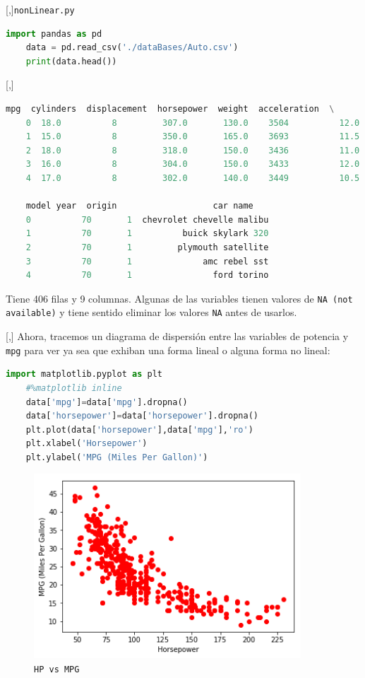 [,]{\texttt{nonLinear.py}}
\begin{lstlisting}[language=Python]
	import pandas as pd
	data = pd.read_csv('./dataBases/Auto.csv')
	print(data.head())
\end{lstlisting}

[,]{}

\begin{lstlisting}[language=Python]
	mpg  cylinders  displacement  horsepower  weight  acceleration  \
	0  18.0          8         307.0       130.0    3504          12.0
	1  15.0          8         350.0       165.0    3693          11.5
	2  18.0          8         318.0       150.0    3436          11.0
	3  16.0          8         304.0       150.0    3433          12.0
	4  17.0          8         302.0       140.0    3449          10.5
	
	model year  origin                   car name
	0          70       1  chevrolet chevelle malibu
	1          70       1          buick skylark 320
	2          70       1         plymouth satellite
	3          70       1              amc rebel sst
	4          70       1                ford torino
\end{lstlisting}


Tiene 406 filas y 9 columnas. Algunas de las variables tienen valores de \texttt{NA (not available)} y tiene sentido eliminar los valores \texttt{NA} antes de usarlos.

[,]{}
Ahora, tracemos un diagrama de dispersión entre las variables de potencia y \texttt{mpg} para ver
ya sea que exhiban una forma lineal o alguna forma no lineal:
\begin{lstlisting}[language=Python]
	import matplotlib.pyplot as plt
	#%matplotlib inline
	data['mpg']=data['mpg'].dropna()
	data['horsepower']=data['horsepower'].dropna()
	plt.plot(data['horsepower'],data['mpg'],'ro')
	plt.xlabel('Horsepower')
	plt.ylabel('MPG (Miles Per Gallon)')
\end{lstlisting}


\begin{figure}
	\centering
	\includegraphics[width=10cm,keepaspectratio=true]{./images/hpVsMpg.png}
	\caption{\texttt{HP vs MPG}}
	\label{fig:hp}
\end{figure}


